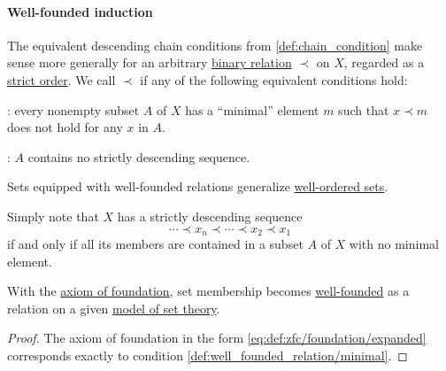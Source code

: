 \paragraph{Well-founded induction}

\begin{definition}\label{def:well_founded_relation}
  The equivalent descending chain conditions from \cref{def:chain_condition} make sense more generally for an arbitrary \hyperref[def:binary_relation]{binary relation} \( {\prec} \) on \( X \), regarded as a \hyperref[def:partially_ordered_set/strict]{strict order}. We call \( {\prec} \)  if any of the following equivalent conditions hold:

  \begin{thmenum}
     : every nonempty subset \( A \) of \( X \) has a \enquote{minimal} element \( m \) such that \( x \prec m \) does not hold for any \( x \) in \( A \).

     : \( A \) contains no strictly descending sequence.
  \end{thmenum}
\end{definition}
\begin{comments}
  \item Sets equipped with well-founded relations generalize \hyperref[def:well_ordered_set]{well-ordered sets}.
\end{comments}
\begin{defproof}
   Simply note that \( X \) has a strictly descending sequence
  \begin{equation*}
    \cdots \prec x_n \prec \cdots \prec x_2 \prec x_1
  \end{equation*}
  if and only if all its members are contained in a subset \( A \) of \( X \) with no minimal element.
\end{defproof}

\begin{proposition}\label{thm:set_membership_is_well_founded}
  With the \hyperref[def:zfc/foundation]{axiom of foundation}, set membership becomes \hyperref[def:well_founded_relation]{well-founded} as a relation on a given \hyperref[def:set_theory_model]{model of set theory}.
\end{proposition}
\begin{proof}
  The axiom of foundation in the form \eqref{eq:def:zfc/foundation/expanded} corresponds exactly to condition \cref{def:well_founded_relation/minimal}.
\end{proof}


